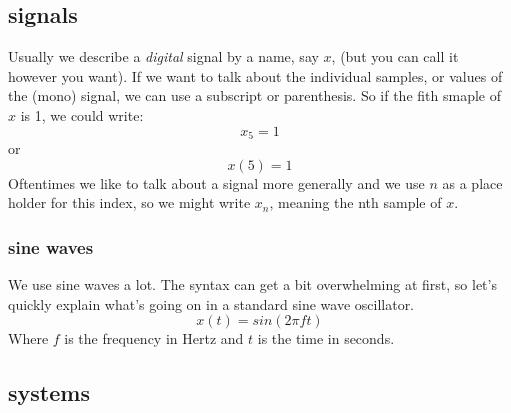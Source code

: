 \subsection{signals}

Usually we describe a \textit{digital} signal by a name, say $x$, (but you can call it however you want). If we want to talk about the individual samples, or values of the (mono) signal, we can use a subscript or parenthesis. So if the fith smaple of $x$ is 1, we could write:
\begin{equation}
	x_5=1
\end{equation}
or 
\begin{equation}
	x(5)=1
\end{equation}
Oftentimes we like to talk about a signal more generally and we use $n$ as a place holder for this index, so we might write $x_n$, meaning the nth sample of $x$.

\subsubsection{sine waves}
We use sine waves a lot. The syntax can get a bit overwhelming at first, so let's quickly explain what's going on in a standard sine wave oscillator.
\begin{equation}
	x(t) = sin(2\pi f t)
\end{equation}
Where $f$ is the frequency in Hertz and $t$ is the time in seconds.






\subsection{systems}


